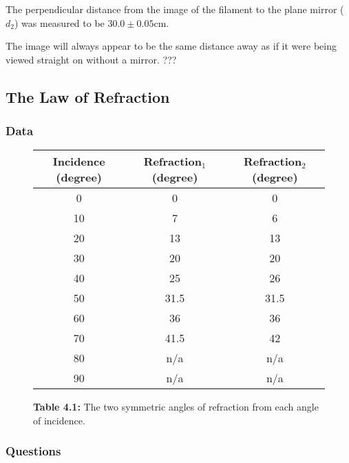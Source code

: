 \documentclass[12pt]{article}
\begin{document}
\subsubsubsection{}

The perpendicular distance from the image of the filament to the plane mirror
(\(d_2\)) was measured to be \(30.0 \pm 0.05 \si{\centi\meter}\).

\subsubsubsection{}

The image will always appear to be the same distance away as if it were being
viewed straight on without a mirror. ???



\subsection{The Law of Refraction}

\subsubsection{Data}

\begin{figure}[H]
  \label{tab:4.1}
  \begin{center}
    \begin{tabular}{|c|c|c|}
      \hline
      Incidence (\si{degree}) & Refraction\(_1\) (\si{degree}) &
                                                                 Refraction\(_2\)
                                                                 (\si{degree})
      \\
      \hline
      0  & 0    & 0 \\
      10 & 7    & 6 \\
      20 & 13   & 13 \\
      30 & 20   & 20 \\
      40 & 25   & 26 \\
      50 & 31.5 & 31.5 \\
      60 & 36   & 36 \\
      70 & 41.5 & 42 \\
      80 & n/a  & n/a \\
      90 & n/a  & n/a \\
      \hline
      \end{tabular}
      \end{center}
      \caption{\textbf{Table 4.1:} The two symmetric angles of refraction from each
  angle of incidence.}
\end{figure}

\subsubsection{Questions}
\end{document}
